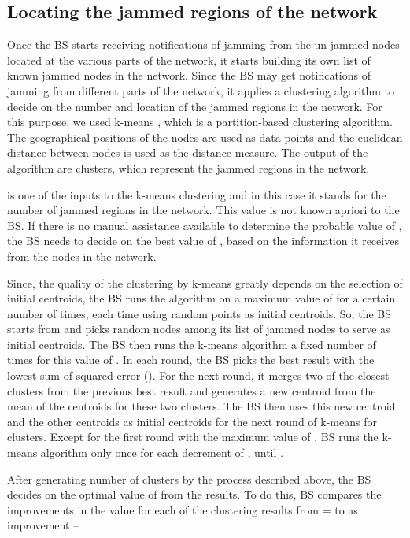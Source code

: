 \documentclass[conference]{IEEEtran}
\begin{document}
\subsection{Locating the jammed regions of the network}
\label{reg_find}

Once the BS starts receiving notifications of jamming from the un-jammed nodes located at the various parts of the network, it starts building its own list of known jammed nodes in the network. Since the BS may get notifications of jamming from different parts of the network, it applies a clustering algorithm to decide on the number and location of the jammed regions in the network. For this purpose, we used k-means \cite{KMEANS, KMEANS67}, which is a partition-based clustering algorithm. The geographical positions of the nodes are used as data points and the euclidean distance between nodes is used as the distance measure. The output of the algorithm are clusters, which represent the jammed regions in the network.

 is one of the inputs to the k-means clustering and in this case it stands for the number of jammed regions in the network. This value is not known apriori to the BS. If there is no manual assistance available to determine the probable value of , the BS needs to decide on the best value of , based on the information it receives from the nodes in the network.

Since, the quality of the clustering by k-means greatly depends on the selection of initial centroids, the BS runs the algorithm on a maximum value of  for a certain number of times, each time using  random points as initial centroids. So, the BS starts from  and picks  random nodes among its list of jammed nodes to serve as  initial centroids. The BS then runs the k-means algorithm a fixed number of times for this value of . In each round, the BS picks the best result with the lowest sum of squared error (). For the next round, it merges two of the closest clusters from the previous best result and generates a new centroid from the mean of the centroids for these two clusters. The BS then uses this new centroid and the other  centroids as initial centroids for the next round of k-means for  clusters. Except for the first round with the maximum value of , BS runs the k-means algorithm only once for each decrement of , until . 


After generating  number of clusters by the process described above, the BS decides on the optimal value of  from the results. To do this, BS compares the improvements in the  value for each of the clustering results from  =  to  as improvement  --
\end{document}
